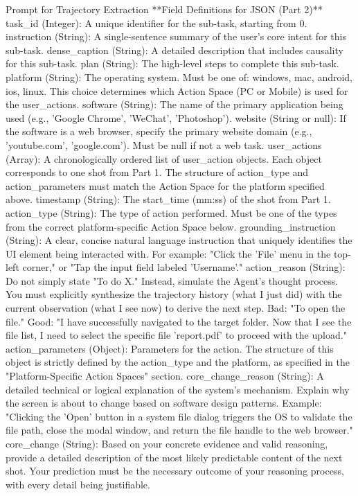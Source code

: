 \documentclass{llmxive}
\begin{document}
\begin{promptbox}{Prompt for Trajectory Extraction}
**Field Definitions for JSON (Part 2)**
task_id (Integer): A unique identifier for the sub-task, starting from 0.
instruction (String): A single-sentence summary of the user's core intent for this sub-task.
dense_caption (String): A detailed description that includes causality for this sub-task.
plan (String): The high-level steps to complete this sub-task.
platform (String): The operating system. Must be one of: windows, mac, android, ios, linux. This choice determines which Action Space (PC or Mobile) is used for the user_actions.
software (String): The name of the primary application being used (e.g., 'Google Chrome', 'WeChat', 'Photoshop').
website (String or null): If the software is a web browser, specify the primary website domain (e.g., 'youtube.com', 'google.com'). Must be null if not a web task.
user_actions (Array): A chronologically ordered list of user_action objects. Each object corresponds to one shot from Part 1. The structure of action_type and action_parameters must match the Action Space for the platform specified above.
timestamp (String): The start_time (mm:ss) of the shot from Part 1.
action_type (String): The type of action performed. Must be one of the types from the correct platform-specific Action Space below.
grounding_instruction (String): A clear, concise natural language instruction that uniquely identifies the UI element being interacted with. For example: "Click the 'File' menu in the top-left corner," or "Tap the input field labeled 'Username'."
action_reason (String): Do not simply state "To do X." Instead, simulate the Agent's thought process. You must explicitly synthesize the trajectory history (what I just did) with the current observation (what I see now) to derive the next step. Bad: "To open the file." Good: "I have successfully navigated to the target folder. Now that I see the file list, I need to select the specific file 'report.pdf' to proceed with the upload."
action_parameters (Object): Parameters for the action. The structure of this object is strictly defined by the action_type and the platform, as specified in the "Platform-Specific Action Spaces" section.
core_change_reason (String): A detailed technical or logical explanation of the system's mechanism. Explain why the screen is about to change based on software design patterns. Example: "Clicking the 'Open' button in a system file dialog triggers the OS to validate the file path, close the modal window, and return the file handle to the web browser."
core_change (String): Based on your concrete evidence and valid reasoning, provide a detailed description of the most likely predictable content of the next shot. Your prediction must be the necessary outcome of your reasoning process, with every detail being justifiable.


\end{promptbox}
\end{document}
